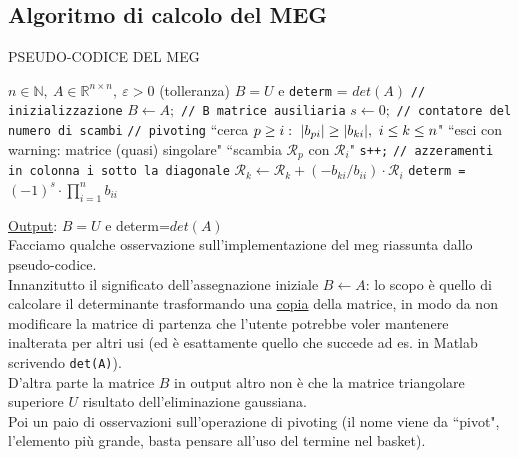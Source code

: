 \documentclass[12pt,a4paper]{article}
\DeclarePairedDelimiter{\abs}{\lvert}{\rvert}
\begin{document}
\subsection{Algoritmo di calcolo del MEG}
\begin{algorithm}
\caption{PSEUDO-CODICE DEL MEG}
\begin{algorithmic}
    \REQUIRE $n \in \mathbb{N}, \ A \in \mathbb{R}^{n \times n}, \ \varepsilon > 0$ (tolleranza)
    \ENSURE $B = U$ e \verb|determ| = $det(A)$
    \STATE \verb|// inizializzazione|
    \STATE $B \leftarrow A;$ \verb|// B matrice ausiliaria|
    \STATE $s \leftarrow 0;$ \verb|// contatore del numero di scambi|
        \STATE \verb|// pivoting|
        \STATE ``cerca $p \ge i: \ \abs{b_{pi}} \ge \abs{b_{ki}}, \ i \le k \le n$"
            \STATE ``esci con warning: matrice (quasi) singolare"
        \ENDIF
            \STATE ``scambia $\mathcal{R}_p$ con $\mathcal{R}_i$"
            \STATE \verb|s++;|
        \ENDIF
        \STATE \verb|// azzeramenti in colonna i sotto la diagonale|
            \STATE $\mathcal{R}_k \leftarrow \mathcal{R}_k + (-b_{ki}/b_{ii}) \cdot \mathcal{R}_i$
        \ENDFOR
    \ENDFOR
    \STATE \verb|determ = | $(-1)^s \cdot \prod_{i=1}^n b_{ii}$
\end{algorithmic}
\end{algorithm}
\uline{Output}: $B=U$ e determ=$det(A)$\\
Facciamo qualche osservazione sull'implementazione del meg riassunta dallo pseudo-codice.\\
Innanzitutto il significato dell'assegnazione iniziale $B \leftarrow A$: lo scopo è quello di calcolare il determinante trasformando una \uline{copia} della matrice, in modo da non modificare la matrice di partenza che l'utente potrebbe voler mantenere inalterata per altri usi (ed è esattamente quello che succede ad es. in Matlab scrivendo \verb|det(A)|).\\
D'altra parte la matrice $B$ in output altro non è che la matrice triangolare superiore $U$ risultato dell'eliminazione gaussiana.\\
Poi un paio di osservazioni sull'operazione di pivoting (il nome viene da ``pivot", l'elemento più grande, basta pensare all'uso del termine nel basket).\\
\end{document}
